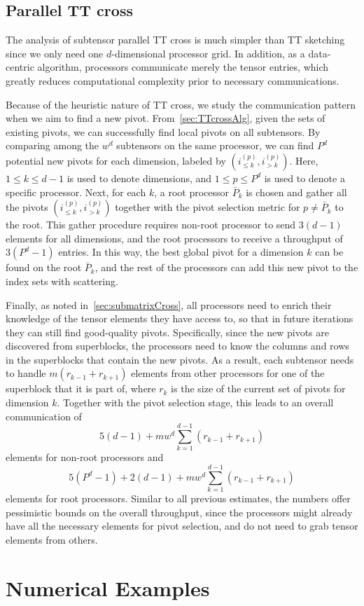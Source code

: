 \documentclass[11pt,a4paper,review]{siamart220329}
\begin{document}
\subsection{Parallel TT cross}
The analysis of subtensor parallel TT cross is much simpler than TT sketching since we only need one $d$-dimensional processor grid. In addition, as a data-centric algorithm, processors communicate merely the tensor entries, which greatly reduces computational complexity prior to necessary communications.

Because of the heuristic nature of TT cross, we study the communication pattern when we aim to find a new pivot. From~\cref{sec:TTcrossAlg}, given the sets of existing pivots, we can successfully find local pivots on all subtensors. By comparing among the $w^d$ subtensors on the same processor, we can find $P^d$ potential new pivots for each dimension, labeled by $(i_{\le k}^{(p)},i_{>k}^{(p)})$. Here, $1 \le k \le d-1$ is used to denote dimensions, and $1 \le p \le P^d$ is used to denote a specific processor. Next, for each $k$, a root processor $\bar{P}_k$ is chosen and gather all the pivots $(i_{\le k}^{(p)},i_{>k}^{(p)})$ together with the pivot selection metric for $p \neq \bar{P}_k$ to the root. This gather procedure requires non-root processor to send $3(d-1)$ elements for all dimensions, and the root processors to receive a throughput of $3(P^d-1)$ entries. In this way, the best global pivot for a dimension $k$ can be found on the root $\bar{P}_k$, and the rest of the processors can add this new pivot to the index sets with scattering. 

Finally, as noted in~\cref{sec:submatrixCross}, all processors need to enrich their knowledge of the tensor elements they have access to, so that in future iterations they can still find good-quality pivots. Specifically, since the new pivots are discovered from superblocks, the processors need to know the columns and rows in the superblocks that contain the new pivots. As a result, each subtensor needs to handle $m(r_{k-1}+r_{k+1})$ elements from other processors for one of the superblock that it is part of, where $r_k$ is the size of the current set of pivots for dimension $k$. Together with the pivot selection stage, this leads to an overall communication of
\begin{equation} \label{eq:crossCommnonroot}
5(d-1)+mw^d\sum_{k=1}^{d-1}(r_{k-1}+r_{k+1})
\end{equation}
elements for non-root processors and
\begin{equation} \label{eq:crossCommroot}
5(P^d-1)+2(d-1)+mw^d\sum_{k=1}^{d-1}(r_{k-1}+r_{k+1})
\end{equation}
elements for root processors. Similar to all previous estimates, the numbers offer pessimistic bounds on the overall throughput, since the processors might already have all the necessary elements for pivot selection, and do not need to grab tensor elements from others.

\section{Numerical Examples}
\label{sec:NumericalExamples}

\printbibliography
\end{document}
